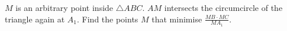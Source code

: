 $M$ is an arbitrary point inside $\triangle ABC$. $AM$ intersects the circumcircle of the triangle again at $A_1$. Find the points $M$ that minimise $\frac{MB\cdot MC}{MA_1}$.